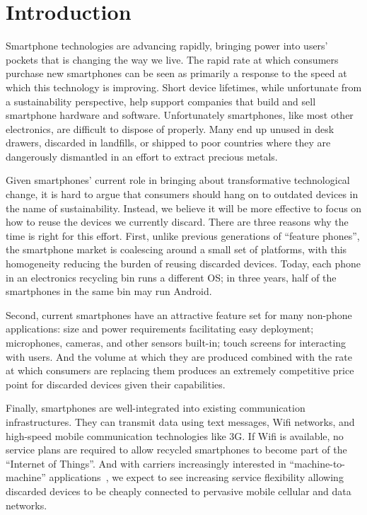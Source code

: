 \section{Introduction}

Smartphone technologies are advancing rapidly, bringing power into users'
pockets that is changing the way we live. The rapid rate at which consumers
purchase new smartphones can be seen as primarily a response to the speed at
which this technology is improving. Short device lifetimes, while unfortunate
from a sustainability perspective, help support companies that build and sell
smartphone hardware and software. Unfortunately smartphones, like most other
electronics, are difficult to dispose of properly. Many end up unused in desk
drawers, discarded in landfills, or shipped to poor countries where they are
dangerously dismantled in an effort to extract precious metals.

Given smartphones' current role in bringing about transformative
technological change, it is hard to argue that consumers should hang on to
outdated devices in the name of sustainability. Instead, we believe it will
be more effective to focus on how to reuse the devices we currently discard.
There are three reasons why the time is right for this effort. First, unlike
previous generations of ``feature phones'', the smartphone market is
coalescing around a small set of platforms, with this homogeneity reducing
the burden of reusing discarded devices. Today, each phone in an electronics
recycling bin runs a different OS; in three years, half of the smartphones in
the same bin may run Android.

Second, current smartphones have an attractive feature set for many non-phone
applications: size and power requirements facilitating easy deployment;
microphones, cameras, and other sensors built-in; touch screens for
interacting with users. And the volume at which they are produced combined
with the rate at which consumers are replacing them produces an extremely
competitive price point for discarded devices given their capabilities.

Finally, smartphones are well-integrated into existing communication
infrastructures. They can transmit data using text messages, Wifi networks,
and high-speed mobile communication technologies like 3G. If Wifi is
available, no service plans are required to allow recycled smartphones to
become part of the ``Internet of Things''. And with carriers increasingly
interested in ``machine-to-machine'' applications~\cite{sprint-m2m}, we
expect to see increasing service flexibility allowing discarded devices to be
cheaply connected to pervasive mobile cellular and data networks.

